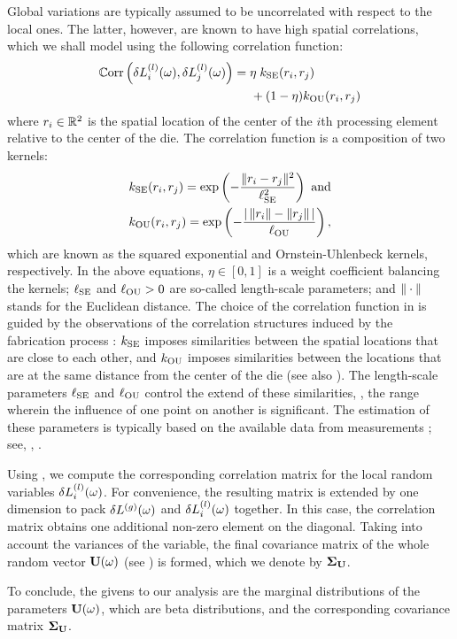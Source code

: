 Global variations are typically assumed to be uncorrelated with respect to the local ones.
The latter, however, are known to have high spatial correlations, which we shall model using the following correlation function:
\begin{align}
  \oCorr{\lLeff_i(\o), \lLeff_j(\o)} \elabel{correlation-function} &= \eta \; \fCorr_\SE(\r_i, \r_j) \\
  & { } \;\;\;\;\; + (1 - \eta) \fCorr_\OU(\r_i, \r_j) \nonumber
\end{align}
where $r_i \in \mathbb{R}^2$ is the spatial location of the center of the $i$th processing element relative to the center of the die. The correlation function is a composition of two kernels:
\begin{align*}
  & \fCorr_\SE(\r_i, \r_j) = \exp\left(-\frac{\norm{\r_i - \r_j}^2}{\ell_\SE^2}\right) \text{ and} \\
  & \fCorr_\OU(\r_i, \r_j) = \exp\left(- \frac{\abs{\,\norm{\r_i} - \norm{\r_j}\,}}{\ell_\OU} \right),
\end{align*}
which are known as the squared exponential and Ornstein-Uhlenbeck kernels, respectively.
In the above equations, $\eta \in [0, 1]$ is a weight coefficient balancing the kernels; $\ell_{\text{SE}}$ and $\ell_{\text{OU}} > 0$ are so-called length-scale parameters; and $\| \cdot \|$ stands for the Euclidean distance.
The choice of the correlation function in  is guided by the observations of the correlation structures induced by the fabrication process \cite{chandrakasan2001, friedberg2005, cheng2011}: $\fCorr_\SE$ imposes similarities between the spatial locations that are close to each other, and $\fCorr_\OU$ imposes similarities between the locations that are at the same distance from the center of the die (see also \cite{ghanem1991, ghanta2006}).
The length-scale parameters $\ell_{\text{SE}}$ and $\ell_{\text{OU}}$ control the extend of these similarities, \ie, the range wherein the influence of one point on another is significant. The estimation of these parameters is typically based on the available data from measurements \cite{ghanta2006}; see, \eg, \cite{friedberg2005}.

Using , we compute the corresponding correlation matrix for the local random variables $\delta L^{(l)}_i(\omega)$.
For convenience, the resulting matrix is extended by one dimension to pack ${\delta L^{(g)}}(\omega)$ and $\delta L^{(l)}_i(\omega)$ together.
In this case, the correlation matrix obtains one additional non-zero element on the diagonal.
Taking into account the variances of the variable, the final covariance matrix of the whole random vector $\mathbf{U}(\omega)$ (see ) is formed, which we denote by $\mCov_\vU$.

To conclude, the givens to our analysis are the marginal distributions of the parameters $\mathbf{U}(\omega)$, which are beta distributions, and the corresponding covariance matrix $\mCov_\vU$.
